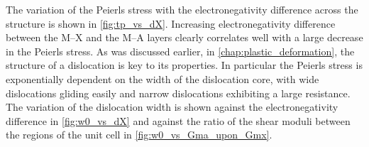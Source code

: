 The variation of the Peierls stress with the electronegativity difference across the structure is shown in \autoref{fig:tp_vs_dX}. Increasing electronegativity difference between the M--X and the M--A layers clearly correlates well with a large decrease in the Peierls stress. As was discussed earlier, in \autoref{chap:plastic_deformation}, the structure of a dislocation is key to its properties. In particular the Peierls stress is exponentially dependent on the width of the dislocation core, with wide dislocations gliding easily and narrow dislocations exhibiting a large resistance. The variation of the dislocation width is shown against the electronegativity difference in \autoref{fig:w0_vs_dX} and against the ratio of the shear moduli between the regions of the unit cell in \autoref{fig:w0_vs_Gma_upon_Gmx}.




